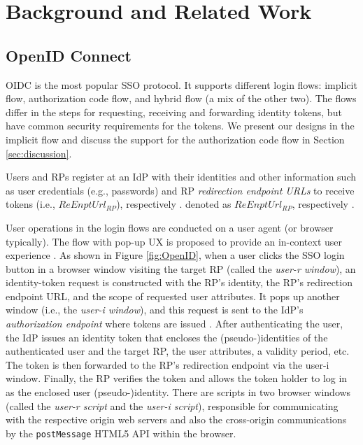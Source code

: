 \section{Background and Related Work}
\label{sec:background}

\subsection{OpenID Connect}
\label{subsec:OIDC}
OIDC \cite{OpenIDConnect} is the most popular SSO protocol. It supports different login flows: implicit flow, authorization code flow, and hybrid flow (a mix of the other two).
The flows differ in the steps for requesting, receiving and forwarding identity tokens, but have common security requirements for the tokens.
We present our designs in the implicit flow and discuss the support for the authorization code flow in Section \ref{sec:discussion}.

Users and RPs register at an IdP with their identities
and other information such as user credentials (e.g., passwords)
and RP \emph{redirection endpoint URLs} to receive tokens (i.e., $ReEnptUrl_{RP}$), respectively  \cite{rfc6749}.
denoted as $ReEnptUrl_{RP}$, respectively  \cite{rfc6749}.

User operations in the login flows are conducted on a user agent (or browser typically).
The flow with pop-up UX is proposed to provide an in-context user experience \cite{dimvaLiM16,GoogleIdIntegrate,uber}.
As shown in Figure \ref{fig:OpenID},
when a user clicks the SSO login button in a browser window visiting the target RP 
(called the \emph{user-r window}),
 an identity-token request is constructed with the RP's identity, the RP's redirection endpoint URL, and the scope of requested user attributes.
It pops up another window (i.e., the \emph{user-i window}),
    and this request is sent to the IdP's \emph{authorization endpoint} where tokens are issued \cite{rfc6749,OpenIDConnect}.
After authenticating the user, the IdP issues an identity token that encloses the (pseudo-)identities of the authenticated user and the target RP, the user attributes, a validity period, etc.
The token is then forwarded to the RP's redirection endpoint via the user-i window.
Finally, the RP verifies the token and allows the token holder to log in as the enclosed user (pseudo-)identity.
There are scripts in two browser windows (called the \emph{user-r script} and the \emph{user-i script}),
    responsible for communicating with the respective origin web servers
    and also the cross-origin
communications by the \verb+postMessage+ HTML5 API \cite{postm-targeto} within the browser.


